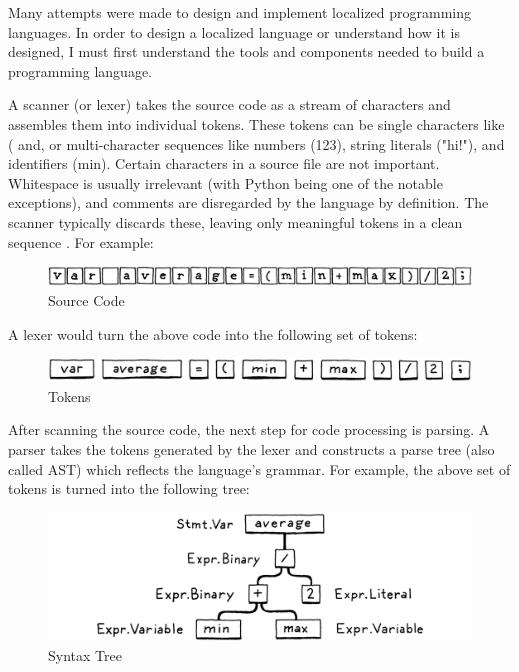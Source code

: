 Many attempts were made to design and implement localized programming languages. In order to design a localized language or understand how it is designed, I must first understand the tools and components needed to build a programming language.

A scanner (or lexer) takes the source code as a stream of characters and assembles them into individual tokens. These tokens can be single characters like ( and, or multi-character sequences like numbers (123), string literals ("hi!"), and identifiers (min).
Certain characters in a source file are not important. Whitespace is usually irrelevant (with Python being one of the notable exceptions), and comments are disregarded by the language by definition. The scanner typically discards these, leaving only meaningful tokens in a clean sequence \cite{nystrom2021crafting}. For example:
\begin{figure}[ht]
\centering
\includegraphics[width=15cm]{ch2-images/source-ccode.png}
\caption{Source Code \cite{nystrom2021crafting}}
\label{fig:Source Code}
\end{figure}

A lexer would turn the above code into the following set of tokens:
\begin{figure}[ht]
\centering
\includegraphics[width=15cm]{ch2-images/tokens.png}
\caption{Tokens \cite{nystrom2021crafting}}
\label{fig:Tokens}
\end{figure}

After scanning the source code, the next step for code processing is parsing. A parser takes the tokens generated by the lexer and constructs a parse tree (also called \ac{AST}) which reflects the language's grammar. For example, the above set of tokens is turned into the following tree:
\begin{figure}[ht]
\centering
\includegraphics[width=15cm]{ch2-images/parser.png}
\caption{Syntax Tree \cite{nystrom2021crafting}}
\label{fig:Syntax Tree}
\end{figure}

